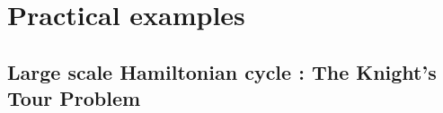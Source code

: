 \documentclass{article}
\begin{document}
%
%
%
%

\newpage{}
\section{Practical examples}

\subsection{Large scale Hamiltonian cycle : The Knight's Tour Problem}
\end{document}
